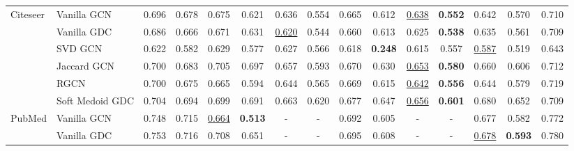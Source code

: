 \documentclass[letterpaper]{article} %
\begin{document}
\begin{table*}[ht]
{\begin{tabular}{llccccccccccccc}
    \cline{1-15}
    \multirow{6}{*}{Citeseer} & Vanilla GCN                                        & 0.696       & 0.678      & 0.675             & 0.621          & 0.636             & 0.554 & 0.665               & 0.612           & \underline{0.638} & \textbf{0.552} & 0.642             & 0.570          & 0.710             \\
                              & Vanilla GDC                                        & 0.686       & 0.666      & 0.671             & 0.631          & \underline{0.620} & 0.544 & 0.660               & 0.613           & 0.625             & \textbf{0.538} & 0.635             & 0.561          & 0.709             \\
                              & SVD GCN                                            & 0.622       & 0.582      & 0.629             & 0.577          & 0.627             & 0.566 & 0.618               & \textbf{0.248}  & 0.615             & 0.557          & \underline{0.587} & 0.519          & 0.643             \\
                              & Jaccard GCN                                        & 0.700       & 0.683      & 0.705             & 0.697          & 0.657             & 0.593 & 0.670               & 0.630           & \underline{0.653} & \textbf{0.580} & 0.660             & 0.606          & 0.712             \\
                              & RGCN                                               & 0.700       & 0.675      & 0.665             & 0.594          & 0.644             & 0.565 & 0.669               & 0.615           & \underline{0.642} & \textbf{0.556} & 0.644             & 0.579          & 0.719             \\
                              & Soft Medoid GDC                                    & 0.704       & 0.694      & 0.699             & 0.691          & 0.663             & 0.620 & 0.677               & 0.647           & \underline{0.656} & \textbf{0.601} & 0.680             & 0.652          & 0.709             \\
    \cline{1-15}
    \multirow{5}{*}{PubMed}   & Vanilla GCN                                        & 0.748       & 0.715      & \underline{0.664} & \textbf{0.513} & -                 & -     & 0.692               & 0.605           & -                 & -              & 0.677             & 0.582          & 0.772             \\
                              & Vanilla GDC                                        & 0.753       & 0.716      & 0.708             & 0.651          & -                 & -     & 0.695               & 0.608           & -                 & -              & \underline{0.678} & \textbf{0.593} & 0.780             \\

\end{tabular}}
\end{table*}
\end{document}
